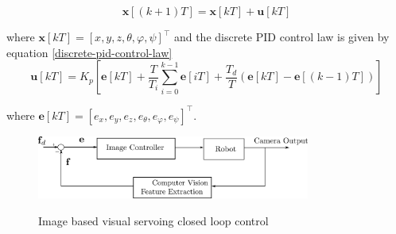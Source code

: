 \begin{equation}
\mathbf{x}[(k+1)T] = \mathbf{x}[kT] + \mathbf{u}[kT]
\end{equation}

where $\mathbf{x}[kT] = [x, y, z, θ, φ, ψ]^\top$ and the discrete PID control law is given by equation \ref{discrete-pid-control-law}
\begin{equation}
\label{discrete-pid-control-law}
\mathbf{u}[kT] = K_p \left[ \mathbf{e}[kT] + \frac{T}{T_i} \sum_{i=0}^{k-1} \mathbf{e}[iT] + \frac{T_d}{T} \left( \mathbf{e}[kT] - \mathbf{e}[(k-1)T] \right) \right]
\end{equation}

where $\mathbf{e}[kT] = [e_x, e_y, e_z, e_θ, e_φ, e_ψ]^\top$.

\begin{center}
\begin{figure}[H]
\centering
\includegraphics[width=0.8\textwidth]{images/visual-servoing-image-based.png}\\
\caption{Image based visual servoing closed loop control}
\label{visual-servoing-image-based-control}
\end{figure}
\end{center}
